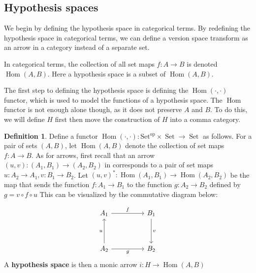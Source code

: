 \documentclass{article}
\theoremstyle{definition}
\newtheorem{definition}{Definition}[section]
\begin{document}
\subsection{Hypothesis spaces}
We begin by defining the hypothesis space in categorical terms. By redefining the hypothesis space in categorical terms, we can define a version space transform as an arrow in a category instead of a separate set. 

In categorical terms, the collection of all set maps $f: A \rightarrow B$ is denoted $\operatorname{Hom}(A,B)$. Here a hypothesis space is a subset of $\operatorname{Hom}(A,B)$. 

The first step to defining the hypothesis space is defining the $\operatorname{Hom}(\cdot, \cdot)$ functor, which is used to model the functions of a hypothesis space. The $\operatorname{Hom}$ functor is not enough alone though, as it does not preserve $A$ and $B$. To do this, we will define $H$ first then move the construction of $H$ into a comma category.

\begin{definition}
Define a functor $\operatorname{Hom}(\cdot,\cdot): \operatorname{Set^{op}} \times \operatorname{Set} \rightarrow \operatorname{Set}$ as follows. For a pair of sets $(A,B)$, let $\operatorname{Hom}(A,B)$ denote the collection of set maps $f:A\rightarrow B$. As for arrows, first recall that an arrow $(u,v):(A_1, B_1) \rightarrow (A_2, B_2)$ in corresponds to a pair of set maps $u: A_2 \rightarrow A_1, v:B_1\rightarrow B_2$. Let $(u,v)^*: \operatorname{Hom}(A_1,B_1) \rightarrow \operatorname{Hom}(A_2,B_2)$ be the map that sends the function $f:A_1\rightarrow B_1$ to the function $g: A_2 \rightarrow B_2$ defined by $g=v \circ f \circ u$ This can be visualized by the commutative diagram below: 

\[\begin{tikzcd}
	{A_1} && {B_1} \\
	\\
	{A_2} && {B_2}
	\arrow["f", from=1-1, to=1-3]
	\arrow["u", from=3-1, to=1-1]
	\arrow["g"', from=3-1, to=3-3]
	\arrow["v", from=1-3, to=3-3]
\end{tikzcd}\]
A \textbf{hypothesis space} is then a monic arrow $i:H\rightarrow \operatorname{Hom}(A,B)$
\end{definition}
\end{document}
